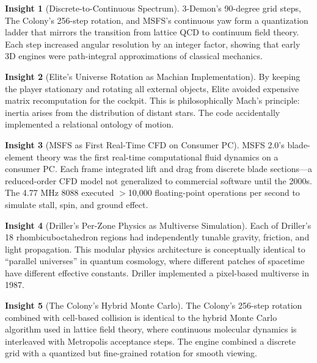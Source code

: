 \documentclass[11pt,a4paper]{article}
\theoremstyle{definition}
\newtheorem{insight}{Insight}[section]
\begin{document}
\begin{insight}[Discrete-to-Continuous Spectrum]
3-Demon's 90-degree grid steps, The Colony's 256-step rotation, and MSFS's continuous yaw form a quantization ladder that mirrors the transition from lattice QCD to continuum field theory. Each step increased angular resolution by an integer factor, showing that early 3D engines were path-integral approximations of classical mechanics.
\end{insight}

\begin{insight}[Elite's Universe Rotation as Machian Implementation]
By keeping the player stationary and rotating all external objects, Elite avoided expensive matrix recomputation for the cockpit. This is philosophically Mach's principle: inertia arises from the distribution of distant stars. The code accidentally implemented a relational ontology of motion.
\end{insight}

\begin{insight}[MSFS as First Real-Time CFD on Consumer PC]
MSFS 2.0's blade-element theory was the first real-time computational fluid dynamics on a consumer PC. Each frame integrated lift and drag from discrete blade sections---a reduced-order CFD model not generalized to commercial software until the 2000s. The 4.77 MHz 8088 executed $>$10,000 floating-point operations per second to simulate stall, spin, and ground effect.
\end{insight}

\begin{insight}[Driller's Per-Zone Physics as Multiverse Simulation]
Each of Driller's 18 rhombicuboctahedron regions had independently tunable gravity, friction, and light propagation. This modular physics architecture is conceptually identical to ``parallel universes'' in quantum cosmology, where different patches of spacetime have different effective constants. Driller implemented a pixel-based multiverse in 1987.
\end{insight}

\begin{insight}[The Colony's Hybrid Monte Carlo]
The Colony's 256-step rotation combined with cell-based collision is identical to the hybrid Monte Carlo algorithm used in lattice field theory, where continuous molecular dynamics is interleaved with Metropolis acceptance steps. The engine combined a discrete grid with a quantized but fine-grained rotation for smooth viewing.
\end{insight}
\end{document}
